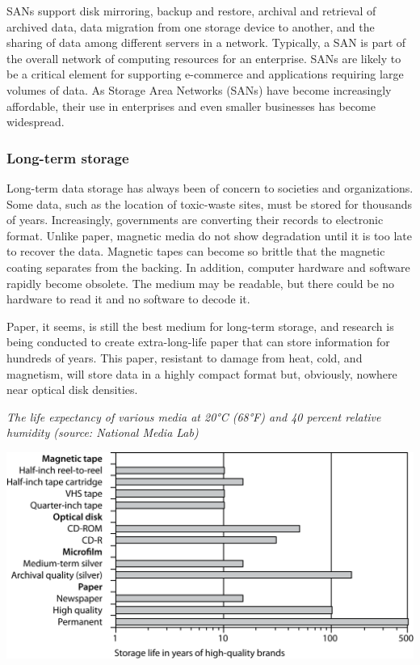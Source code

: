 \documentclass[
]{article}
\begin{document}
SANs support disk mirroring, backup and restore, archival and retrieval
of archived data, data migration from one storage device to another, and
the sharing of data among different servers in a network. Typically, a
SAN is part of the overall network of computing resources for an
enterprise. SANs are likely to be a critical element for supporting
e-commerce and applications requiring large volumes of data. As Storage
Area Networks (SANs) have become increasingly affordable, their use in
enterprises and even smaller businesses has become widespread.

\hypertarget{long-term-storage}{%
\subsubsection*{Long-term storage}\label{long-term-storage}}

Long-term data storage has always been of concern to societies and
organizations. Some data, such as the location of toxic-waste sites,
must be stored for thousands of years. Increasingly, governments are
converting their records to electronic format. Unlike paper, magnetic
media do not show degradation until it is too late to recover the data.
Magnetic tapes can become so brittle that the magnetic coating separates
from the backing. In addition, computer hardware and software rapidly
become obsolete. The medium may be readable, but there could be no
hardware to read it and no software to decode it.

Paper, it seems, is still the best medium for long-term storage, and
research is being conducted to create extra-long-life paper that can
store information for hundreds of years. This paper, resistant to damage
from heat, cold, and magnetism, will store data in a highly compact
format but, obviously, nowhere near optical disk densities.

\emph{The life expectancy of various media at 20°C (68°F) and 40 percent
relative humidity (source: National Media Lab)}

\includegraphics{Figures/Chapter 20/storage life.png}
\end{document}
